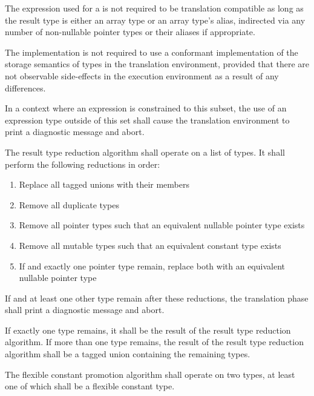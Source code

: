 \specsubitem
The expression used for a  is not required to be
translation compatible as long as the result type is either an array type or an
array type's alias, indirected via any number of non-nullable pointer types or
their aliases if appropriate.

\specsubitem
The implementation is not required to use a conformant implementation of the
storage semantics of types in the translation environment, provided that there
are not observable side-effects in the execution environment as a result of any
differences.

\specsubitem
In a context where an expression is constrained to this subset, the use of an
expression type outside of this set shall cause the translation environment to
print a diagnostic message and abort.


\specsubitem
The result type reduction algorithm shall operate on a list of types. It shall
perform the following reductions in order:

\begin{enumerate}
\item Replace all tagged unions with their members
\item Remove all duplicate types
\item Remove all pointer types such that an equivalent nullable pointer type
	exists
\item Remove all mutable types such that an equivalent constant type exists
\item If  and exactly one pointer type remain, replace both with
	an equivalent nullable pointer type
\end{enumerate}

\specsubitem
If  and at least one other type remain after these reductions,
the translation phase shall print a diagnostic message and abort.

\specsubitem
If exactly one type remains, it shall be the result of the result type reduction
algorithm. If more than one type remains, the result of the result type
reduction algorithm shall be a tagged union containing the remaining types.


\specsubitem
The flexible constant promotion algorithm shall operate on two types, at least
one of which shall be a flexible constant type.

